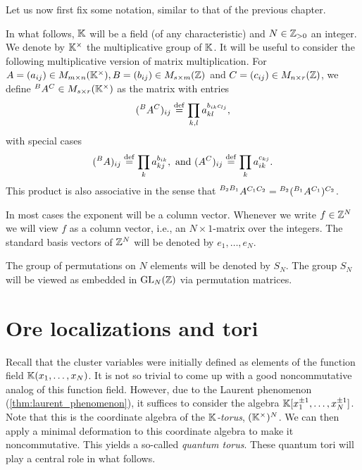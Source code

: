 Let us now first fix some notation, similar to that of the previous chapter.
\begin{notation}
	In what follows, $\mathbb{K}$ will be a field (of any characteristic) and $N \in \mathbb{Z}_{> 0}$
	an integer. We denote by $\mathbb{K}^\times$ the multiplicative
	group of $\mathbb{K}$. It will be useful to consider the following multiplicative version of
	matrix multiplication. For $A = (a_{ij}) \in M_{m \times n}(\mathbb{K}^\times), B = (b_{ij})
		\in M_{s \times m}(\mathbb{Z})$ and $C = (c_{ij}) \in M_{n \times r} (\mathbb{Z})$, we define
	$\prescript{B}{}{}A^C \in M_{s \times r}(\mathbb{K}^\times)$ as the matrix with entries
	\begin{equation*}
		(\prescript{B}{}{}A^C)_{ij}  \overset{\mathrm{def}}{=} \prod_{k, l} a_{kl}^{b_{ik}c_{lj}},
	\end{equation*}
	with special cases
	\begin{equation*}
		(\prescript{B}{}{}A)_{ij} \overset{\mathrm{def}}{=} \prod_{k} a_{kj}^{b_{ik}}, \text{ and }	(A^C)_{ij} \overset{\mathrm{def}}{=} \prod_{k} a_{ik}^{c_{kj}}.
	\end{equation*}
	This product is also associative in the sense that $\prescript{B_2 B_1}{}{A}^{C_1 C_2}
		= \prescript{B_2}{}{}(\prescript{B_1}{}{}A^{C_1})^{C_2}$.

	In most cases the exponent will be a column vector. Whenever we write $f \in \mathbb{Z}^N$ we
	will view $f$ as a column vector, i.e., an $N \times 1$-matrix over the integers. The
	standard basis vectors of $\mathbb{Z}^N$ will be denoted by $e_1, \dots, e_N$.

	The group of permutations on $N$ elements will be denoted by $S_N$. The group $S_N$
	will be viewed as embedded in $\operatorname{GL}_N(\mathbb{Z})$ via permutation matrices.
\end{notation}

\section{Ore localizations and tori}

Recall that the cluster variables were initially defined as elements of the function
field $\mathbb{K}(x_1, \dots, x_N)$. It is not so trivial to come up with a good
noncommutative analog of this function field. However, due to the Laurent phenomenon
(\cref{thm:laurent_phenomenon}), it suffices to consider the algebra $\mathbb{K}[x_1^{\pm 1},
	\dots, x_N^{\pm 1}]$. Note that this is the coordinate algebra of the
\emph{$\mathbb{K}$-torus}, $(\mathbb{K}^\times)^N$. We can then apply a minimal
deformation to this coordinate algebra to make it noncommutative. This yields a
so-called \emph{quantum torus}. These quantum tori will play a
central role in what follows.

